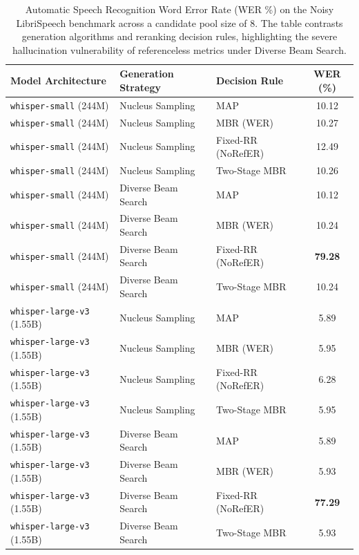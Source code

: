 \begin{table}[htbp]
\centering
\caption{Automatic Speech Recognition Word Error Rate (WER \%) on the Noisy LibriSpeech benchmark across a candidate pool size of 8. The table contrasts generation algorithms and reranking decision rules, highlighting the severe hallucination vulnerability of referenceless metrics under Diverse Beam Search.}
\label{tab:asr_results_empirical}
\begin{tabular}{lllc}
\toprule
\textbf{Model Architecture} & \textbf{Generation Strategy} & \textbf{Decision Rule} & \textbf{WER (\%)} \\
\midrule
\texttt{whisper-small} (244M) & Nucleus Sampling & MAP & 10.12 \\
\texttt{whisper-small} (244M) & Nucleus Sampling & MBR (WER) & 10.27 \\
\texttt{whisper-small} (244M) & Nucleus Sampling & Fixed-RR (NoRefER) & 12.49 \\
\texttt{whisper-small} (244M) & Nucleus Sampling & Two-Stage MBR & 10.26 \\
\midrule
\texttt{whisper-small} (244M) & Diverse Beam Search & MAP & 10.12 \\
\texttt{whisper-small} (244M) & Diverse Beam Search & MBR (WER) & 10.24 \\
\texttt{whisper-small} (244M) & Diverse Beam Search & Fixed-RR (NoRefER) & \textbf{79.28} \\
\texttt{whisper-small} (244M) & Diverse Beam Search & Two-Stage MBR & 10.24 \\
\midrule
\texttt{whisper-large-v3} (1.55B) & Nucleus Sampling & MAP & 5.89 \\
\texttt{whisper-large-v3} (1.55B) & Nucleus Sampling & MBR (WER) & 5.95 \\
\texttt{whisper-large-v3} (1.55B) & Nucleus Sampling & Fixed-RR (NoRefER) & 6.28 \\
\texttt{whisper-large-v3} (1.55B) & Nucleus Sampling & Two-Stage MBR & 5.95 \\
\midrule
\texttt{whisper-large-v3} (1.55B) & Diverse Beam Search & MAP & 5.89 \\
\texttt{whisper-large-v3} (1.55B) & Diverse Beam Search & MBR (WER) & 5.93 \\
\texttt{whisper-large-v3} (1.55B) & Diverse Beam Search & Fixed-RR (NoRefER) & \textbf{77.29} \\
\texttt{whisper-large-v3} (1.55B) & Diverse Beam Search & Two-Stage MBR & 5.93 \\
\bottomrule
\end{tabular}
\end{table}

